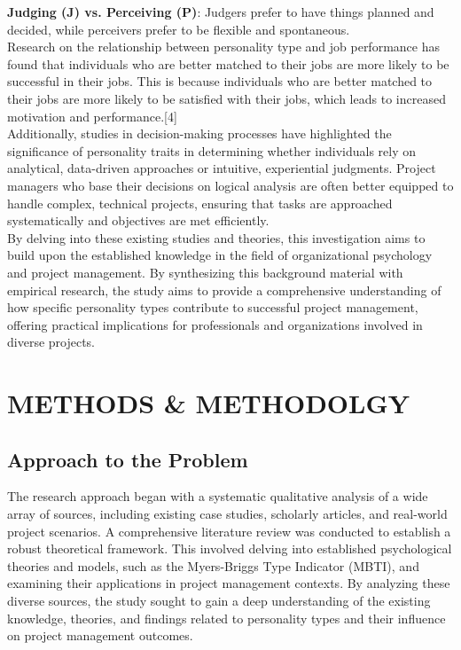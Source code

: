\documentclass[a4Paper]{article}
\begin{document}
\textbf{Judging (J) vs. Perceiving (P)}: Judgers prefer to have things planned and decided, while perceivers prefer to be flexible and spontaneous.\\

Research on the relationship between personality type and job performance has found that individuals who are better matched to their jobs are more likely to be successful in their jobs. This is because individuals who are better matched to their jobs are more likely to be satisfied with their jobs, which leads to increased motivation and performance.[4]\\

Additionally, studies in decision-making processes have highlighted the significance of personality traits in determining whether individuals rely on analytical, data-driven approaches or intuitive, experiential judgments. Project managers who base their decisions on logical analysis are often better equipped to handle complex, technical projects, ensuring that tasks are approached systematically and objectives are met efficiently.\\

By delving into these existing studies and theories, this investigation aims to build upon the established knowledge in the field of organizational psychology and project management. By synthesizing this background material with empirical research, the study aims to provide a comprehensive understanding of how specific personality types contribute to successful project management, offering practical implications for professionals and organizations involved in diverse projects.

\pagebreak


\section{METHODS \& METHODOLGY}

\subsection{Approach to the Problem}
The research approach began with a systematic qualitative analysis of a wide array of sources, including existing case studies, scholarly articles, and real-world project scenarios. A comprehensive literature review was conducted to establish a robust theoretical framework. This involved delving into established psychological theories and models, such as the Myers-Briggs Type Indicator (MBTI), and examining their applications in project management contexts. By analyzing these diverse sources, the study sought to gain a deep understanding of the existing knowledge, theories, and findings related to personality types and their influence on project management outcomes.\\
\end{document}
